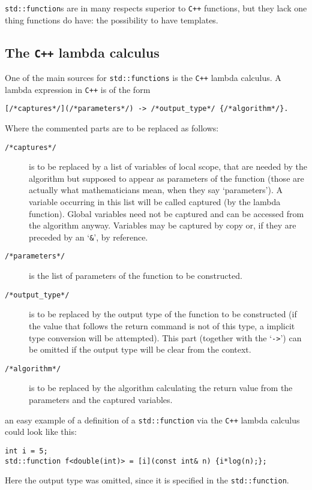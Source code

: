 \documentclass{article}
\newcommand{\cc}{\texttt{C++}\xspace}
\begin{document}
\texttt{std::function}s are in many respects superior to \cc functions, but they lack one thing functions do have: the possibility to have templates.


\subsection{The \cc lambda calculus}

One of the main sources for \texttt{std::functions} is the \cc lambda calculus. A lambda expression in \cc is of the form
\begin{lstlisting}
[/*captures*/](/*parameters*/) -> /*output_type*/ {/*algorithm*/}.
\end{lstlisting}
Where the commented parts are to be replaced as follows:
\begin{description}
\item[\texttt{/*captures*/}] is to be replaced by a list of variables of local scope, that are needed by the algorithm but supposed to appear as parameters of the function (those are actually what mathematicians mean, when they say \lq parameters\rq). A variable occurring in this list will be called captured (by the lambda function). Global variables need not be captured and can be accessed from the algorithm anyway. Variables may be captured by copy or, if they are preceded by an \lq\texttt{\&}\rq, by reference.
\item[\texttt{/*parameters*/}] is the list of parameters of the function to be constructed.
\item[\texttt{/*output\_type*/}] is to be replaced by the output type of the function to be constructed (if the value that follows the return command is not of this type, a implicit type conversion will be attempted). This part (together with the \lq\texttt{->}\rq) can be omitted if the output type will be clear from the context.
\item[\texttt{/*algorithm*/}] is to be replaced by the algorithm calculating the return value from the parameters and the captured variables.
\end{description}
an easy example of a definition of a \texttt{std::function} via the \cc lambda calculus could look like this:
\begin{lstlisting}
int i = 5;
std::function f<double(int)> = [i](const int& n) {i*log(n);};
\end{lstlisting}
Here the output type was omitted, since it is specified in the \texttt{std::function}.
\end{document}
